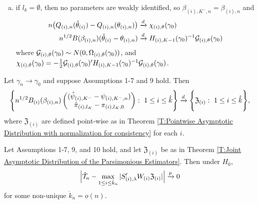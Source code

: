 {\begin{theorem}[5.4]
\begin{enumerate}[a)]
\item if $l_{k} = \emptyset$, then no parameters are weakly identified, so $\beta_{(i), K^{-},n} = \beta_{(i), n}$ and
\begin{align}
n \big( Q_{(i), n}(\hat{\theta}_{(i)}) - Q_{(i), n}(\theta_{(i), n}) \big) 
& \tod \chi_{(i), \theta}(\gamma_{0}) \\
%
n^{1/2} B(\beta_{(i), n}) (\hat{\theta}_{(i)} - \theta_{(i), n}) 
& \tod 
H_{(i), K-1}(\gamma_{0})^{-1} \G_{(i), \theta}(\gamma_{0})
\end{align}
where $\mathcal{G}_{(i), \theta}(\gamma_{0}) \sim N(0, \Omega_{(i), \theta}(\gamma_{0}))$, and $\chi_{(i), \theta}(\gamma_{0}) = -\frac{1}{2} \mathcal{G}_{(i), \theta}(\gamma_{0})' H_{(i), K-1}(\gamma_{0})^{-1} \mathcal{G}_{(i), \theta}(\gamma_{0})$.
\end{enumerate}
\end{theorem}


\begin{theorem}[5.5]\label{T:Joint Asymptotic Distribution of the Parsimonious Estimators}
Let $\gamma_{n} \to \gamma_{0}$ and suppose Assumptions 1-7 and 9 hold.  Then
\begin{equation*}
\Bigg\{ 
n^{1/2} B_{(i)}(\beta_{(i), n}) \begin{pmatrix}  ( \hat{\psi}_{(i), K^{-}} - \psi_{(i), K^{-},n} ) \\ \hat{\pi}_{(i), l_{K}} - \pi_{(i), l_{K}, 0}  \end{pmatrix}
 : \ 1\le i \le \mathring{k} \Bigg\}
\xrightarrow{d}
\Bigg\{ 
\mathfrak{Z}_{(i)} : \ 1\le i \le \mathring{k} \Bigg\},
\end{equation*}
where $\mathfrak{Z}_{(i)}$ are defined point-wise as in Theorem \ref{T:Pointwise Asymptotic Distribution with normalization for consistency} for each $i$.
\end{theorem}


\begin{theorem}\label{T:Test stat limiting distribution}
Let Assumptions 1-7, 9, and 10 hold, and let $\mathfrak{Z}_{(i)}$ be as in Theorem \ref{T:Joint Asymptotic Distribution of the Parsimonious Estimators}.  Then under $H_{0}$,
\begin{equation*}
\Big| \hat{\mathcal{T}}_{n} - \max_{1\le i \le \mathring{k}_{n}} |S_{(i), \lambda}' W_{(i)} \mathfrak{Z}_{(i)}| \Big| \xrightarrow{p} 0
\end{equation*}
for some non-unique $\mathring{k}_{n} = o(n)$.
\end{theorem}

}







